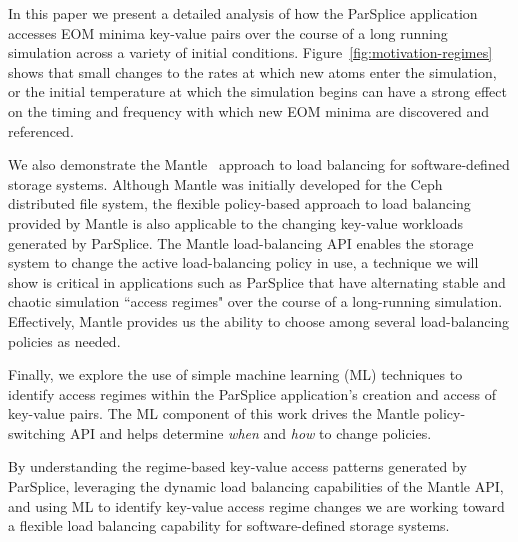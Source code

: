 In this paper we present a detailed analysis of how the ParSplice application
accesses EOM minima key-value pairs over the course of a long running simulation
across a variety of initial conditions. Figure~\ref{fig:motivation-regimes}
shows that small changes to the rates at which new atoms enter the simulation,
or the initial temperature at which the simulation begins can have a strong
effect on the timing and frequency with which new EOM minima are discovered and
referenced.

We also demonstrate the Mantle~\cite{sevilla:sc15-mantle} approach to load
balancing for software-defined storage systems.  Although Mantle was initially
developed for the Ceph distributed file system, the flexible policy-based
approach to load balancing provided by Mantle is also applicable to the
changing key-value workloads generated by ParSplice. The Mantle load-balancing
API enables the storage system to change the active load-balancing policy in
use, a technique we will show is critical in applications such as ParSplice
that have alternating stable and chaotic simulation ``access regimes" over the
course of a long-running simulation.  Effectively, Mantle provides us the
ability to choose among several load-balancing policies as needed.

Finally, we explore the use of simple machine learning (ML) techniques to
identify access regimes within the ParSplice application's creation and access
of key-value pairs. The ML component of this work drives the Mantle
policy-switching API and helps determine \emph{when} and \emph{how} to change
policies.

By understanding the regime-based key-value access patterns generated by
ParSplice, leveraging the dynamic load balancing capabilities of the Mantle
API, and using ML to identify key-value access regime changes we are working
toward a flexible load balancing capability for software-defined storage
systems. 
